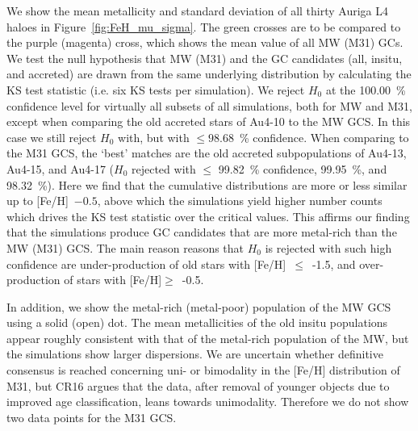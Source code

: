\documentclass[a4paper,fleqn,usenatbib]{mnras}
\begin{document}
We show the mean metallicity and standard deviation of all thirty Auriga L4 haloes
in Figure~\ref{fig:FeH_mu_sigma}. The green crosses are to be compared to the 
purple (magenta) cross, which shows the mean value of all MW (M31) GCs. 
We test the null hypothesis that MW (M31) and the GC candidates (all, insitu, and
accreted) are drawn from the same underlying distribution by calculating the KS
test statistic (i.e. six KS tests per simulation). We reject $H_0$ at the 100.00~\%
confidence level for virtually all subsets of all simulations, both for MW and M31,
except when comparing the old accreted stars of \mbox{Au4-10} to the MW GCS. In this 
case we still reject $H_0$ with, but with $\leq 98.68$~\% confidence. When comparing
to the M31 GCS, the `best' matches are the old accreted subpopulations of \mbox{Au4-13},
\mbox{Au4-15}, and \mbox{Au4-17} ($H_0$ rejected with $\leq$ 99.82~\% confidence, 99.95~\%, 
and 98.32~\%). Here we find that the cumulative distributions are more or less 
similar up to [Fe/H]~$-0.5$, above which the simulations yield higher number 
counts which drives the KS test statistic over the critical values. This affirms
our finding that the simulations produce GC candidates that are more metal-rich 
than the MW (M31) GCS. The main reason reasons that $H_0$ is rejected with such 
high confidence are under-production of old stars with [Fe/H]~$\leq$~-1.5,
and over-production of stars with [Fe/H]$\geq$~-0.5.

In addition, we show the metal-rich (metal-poor) population of the MW GCS using 
a solid (open) dot. The mean metallicities of the old insitu populations appear
roughly consistent with that of the metal-rich population of the MW, but the 
simulations show larger dispersions. We are uncertain whether definitive consensus 
is reached concerning uni- or bimodality in the [Fe/H] distribution of M31, but
CR16 argues that the data, after removal of younger objects due to improved age
classification, leans towards unimodality. Therefore we do not show two data
points for the M31 GCS.
\end{document}
